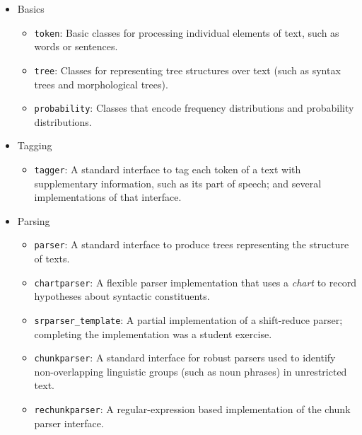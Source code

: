 \documentclass[12pt]{article}
\def\nogap{\setlength\itemsep{.0in}\setlength{\parskip}{0in}}
\begin{document}
{\small
\begin{itemize}\nogap

  \item Basics
    \begin{itemize}\nogap
      \item \texttt{token}: Basic classes for processing individual
            elements of text, such as words or sentences. 
      \item \texttt{tree}: Classes for representing tree structures
            over text (such as syntax trees and morphological trees).
      \item \texttt{probability}: Classes that encode frequency
            distributions and probability distributions.
    \end{itemize}

  \item Tagging
    \begin{itemize}\nogap
      \item \texttt{tagger}: A standard interface to tag each token of
            a text with supplementary information, such as its part of
            speech; and several implementations of that interface.
    \end{itemize}

  \item Parsing
    \begin{itemize}\nogap
      \item \texttt{parser}: A standard interface to produce trees
            representing the structure of texts.
      \item \texttt{chartparser}: A flexible parser implementation
            that uses a \emph{chart} to record hypotheses about
            syntactic constituents.
      \item \texttt{srparser\_template}: A partial implementation of a
            shift-reduce parser; completing the implementation was a
            student exercise.
      \item \texttt{chunkparser}: A standard interface for robust
            parsers used to identify non-overlapping linguistic groups
            (such as noun phrases) in unrestricted text.
      \item \texttt{rechunkparser}: A regular-expression based
            implementation of the chunk parser interface.
    \end{itemize}


\end{itemize}}
\end{document}
